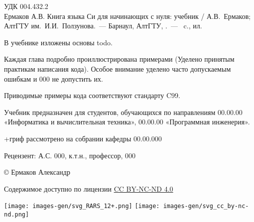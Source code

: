 \documentclass[myc.tex]{subfiles}
\begin{document}
\thispagestyle{empty}
\noindent
УДК 004.432.2\\

Ермаков А.В. Книга языка Си для начинающих с нуля: учебник / А.В.~Ермаков; АлтГТУ им.~И.И.~Ползунова.~--- Барнаул, АлтГТУ, \the\year.~--- \pageref{LastPage}~c., ил.

\vfill

\begin{small}
В учебнике изложены основы todo.



Каждая глава подробно проиллюстрирована примерами (Уделено принятым практикам написания кода). Особое внимание уделено часто допускаемым ошибкам и 000 не допустить их.

Приводимые примеры кода соответствуют стандарту C99.

Учебник предназначен для студентов, обучающихся по направлениям 00.00.00 «Информатика и вычислительная техника», 00.00.00 «Программная инженерия».
\end{small}

\vspace{48pt}

+гриф рассмотрено на собрании кафедры 00.00.000

Рецензент: А.С. 000, к.т.н., профессор, 000

\vspace{36pt}




\copyright{ }\the\year{ }Ермаков Александр

Содержимое доступно по лицензии \href{https://creativecommons.org/licenses/by-nc-nd/4.0/deed.ru}{CC BY-NC-ND 4.0}

\vspace{12pt}

\noindent
\texttt{[image: images-gen/svg\_RARS\_12+.png]} \hfill \texttt{[image: images-gen/svg\_cc\_by-nc-nd.png]}
\end{document}
